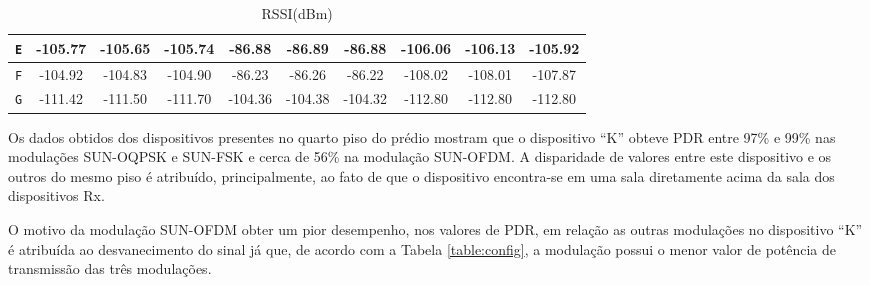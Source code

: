 \begin{table}[H]
\begin{subtable}{\textwidth}
\begin{center}
\begin{tabular}{|c|c|c|c|c|c|c|c|c|c|}
                        \texttt{E} & -105.77                               & -105.65                                 & -105.74                                & -86.88         & -86.89         & -86.88         & -106.06        & -106.13        & -105.92        \\ \hline
                        \texttt{F} & -104.92                               & -104.83                                 & -104.90                                & -86.23         & -86.26         & -86.22         & -108.02        & -108.01        & -107.87        \\ \hline
                        \texttt{G} & -111.42                               & -111.50                                 & -111.70                                & -104.36        & -104.38        & -104.32        & -112.80        & -112.80        & -112.80        \\ \hline
                  \end{tabular}
                  \caption{RSSI(dBm)}
                  \label{table:rssi3}
            \end{center}
      \end{subtable}%
      \label{tab:table1}
\end{table}

Os dados obtidos dos dispositivos presentes no quarto piso do prédio mostram que o dispositivo ``K'' obteve PDR entre 97\% e 99\% nas modulações SUN-OQPSK e SUN-FSK e cerca de 56\% na modulação SUN-OFDM. A disparidade de valores entre este dispositivo e os outros do mesmo piso é atribuído, principalmente, ao fato de que o dispositivo encontra-se em uma sala diretamente acima da sala dos dispositivos Rx.

O motivo da modulação SUN-OFDM obter um pior desempenho, nos valores de PDR, em relação as outras modulações no dispositivo ``K'' é atribuída ao desvanecimento do sinal já que, de acordo com a Tabela \ref{table:config}, a modulação possui o menor valor de potência de transmissão das três modulações.

